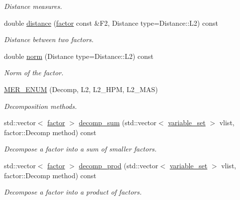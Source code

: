 \begin{DoxyCompactItemize}
\begin{DoxyCompactList}\small\item\em Distance measures. \end{DoxyCompactList}\item 
double \hyperlink{classmerlin_1_1factor_a7a24a413fff9a72ec7be2be294ff5680}{distance} (\hyperlink{classmerlin_1_1factor}{factor} const \&F2, Distance type=Distance\+::\+L2) const 
\begin{DoxyCompactList}\small\item\em Distance between two factors. \end{DoxyCompactList}\item 
double \hyperlink{classmerlin_1_1factor_a4815b5dd93901a617bb9a640f116744c}{norm} (Distance type=Distance\+::\+L2) const 
\begin{DoxyCompactList}\small\item\em Norm of the factor. \end{DoxyCompactList}\item 
\hyperlink{classmerlin_1_1factor_aa0e40deff2eda192ddbc515ce327a43a}{M\+E\+R\+\_\+\+E\+N\+UM} (Decomp, L2, L2\+\_\+\+H\+PM, L2\+\_\+\+M\+AS)\hypertarget{classmerlin_1_1factor_aa0e40deff2eda192ddbc515ce327a43a}{}\label{classmerlin_1_1factor_aa0e40deff2eda192ddbc515ce327a43a}

\begin{DoxyCompactList}\small\item\em Decomposition methods. \end{DoxyCompactList}\item 
std\+::vector$<$ \hyperlink{classmerlin_1_1factor}{factor} $>$ \hyperlink{classmerlin_1_1factor_a581a10c7204e2e5a324140c686d2eed8}{decomp\+\_\+sum} (std\+::vector$<$ \hyperlink{classmerlin_1_1variable__set}{variable\+\_\+set} $>$ vlist, factor\+::\+Decomp method) const 
\begin{DoxyCompactList}\small\item\em Decompose a factor into a sum of smaller factors. \end{DoxyCompactList}\item 
std\+::vector$<$ \hyperlink{classmerlin_1_1factor}{factor} $>$ \hyperlink{classmerlin_1_1factor_a65319f96f91c312f779e1bcab9dd36bc}{decomp\+\_\+prod} (std\+::vector$<$ \hyperlink{classmerlin_1_1variable__set}{variable\+\_\+set} $>$ vlist, factor\+::\+Decomp method) const 
\begin{DoxyCompactList}\small\item\em Decompose a factor into a product of factors. \end{DoxyCompactList}\end{DoxyCompactItemize}
